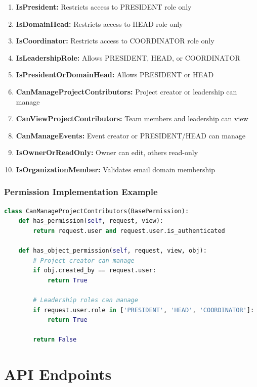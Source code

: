 \documentclass[11pt,a4paper]{article}
\begin{document}
\begin{enumerate}[leftmargin=*]
    \item \textbf{IsPresident:} Restricts access to PRESIDENT role only
    \item \textbf{IsDomainHead:} Restricts access to HEAD role only
    \item \textbf{IsCoordinator:} Restricts access to COORDINATOR role only
    \item \textbf{IsLeadershipRole:} Allows PRESIDENT, HEAD, or COORDINATOR
    \item \textbf{IsPresidentOrDomainHead:} Allows PRESIDENT or HEAD
    \item \textbf{CanManageProjectContributors:} Project creator or leadership can manage
    \item \textbf{CanViewProjectContributors:} Team members and leadership can view
    \item \textbf{CanManageEvents:} Event creator or PRESIDENT/HEAD can manage
    \item \textbf{IsOwnerOrReadOnly:} Owner can edit, others read-only
    \item \textbf{IsOrganizationMember:} Validates email domain membership
\end{enumerate}

\subsubsection{Permission Implementation Example}
\begin{lstlisting}[language=Python]
class CanManageProjectContributors(BasePermission):
    def has_permission(self, request, view):
        return request.user and request.user.is_authenticated
    
    def has_object_permission(self, request, view, obj):
        # Project creator can manage
        if obj.created_by == request.user:
            return True
        
        # Leadership roles can manage
        if request.user.role in ['PRESIDENT', 'HEAD', 'COORDINATOR']:
            return True
        
        return False
\end{lstlisting}

\section{API Endpoints}
\end{document}
